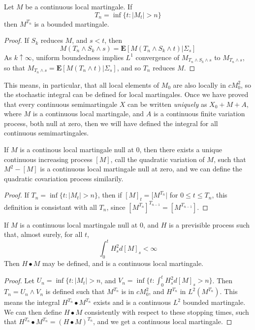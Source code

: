 \begin{lemma}
    Let $M$ be a continuous local martingale. If
    \[ T_n = \inf \{ t : |M_t| > n \} \]
    then $M^{T_n}$ is a bounded martingale.
\end{lemma}
\begin{proof}
    If $S_k$ reduces $M$, and $s < t$, then
    \[ M(T_n \wedge S_k \wedge s) = \mathbf{E}[M(T_n \wedge S_k \wedge t) | \Sigma_s] \]
    As $k \uparrow \infty$, uniform boundedness implies $L^1$ convergence of $M_{T_n \wedge S_k \wedge s}$ to $M_{T_n \wedge s}$, so that $M_{T_n \wedge s} = \mathbf{E}[M(T_n \wedge t)|\Sigma_s]$, and so $T_n$ reduces $M$.
\end{proof}

This means, in particular, that all local elements of $M_0$ are also locally in $cM^2_0$, so the stochastic integral can be defined for local martingales. Once we have proved that every continuous semimartingale $X$ can be written {\it uniquely} as $X_0 + M + A$, where $M$ is a continuous local martingale, and $A$ is a continuous finite variation process, both null at zero, then we will have defined the integral for all continuous semimartingales.

\begin{theorem}
    If $M$ is a continous local martingale null at 0, then there exists a unique continuous increasing process $[M]$, call the quadratic variation of $M$, such that $M^2 - [M]$ is a continuous local martingale null at zero, and we can define the quadratic covariation process similarily.
\end{theorem}
\begin{proof}
    If $T_n = \inf \{ t : |M_t| > n \}$, then if $[M]_t = [M^{T_n}|$ for $0 \leq t \leq T_n$, this definition is consistant with all $T_n$, since $[M^{T_n}]^{T_{n-1}} = [M^{T_{n-1}}]$.
\end{proof}

\begin{theorem}
    If $M$ is a continuous local martingale null at 0, and $H$ is a previsible process such that, almost surely, for all $t$,
    \[ \int_0^t H_s^2 d[M]_s < \infty \]
    Then $H \bullet M$ may be defined, and is a continuous local martingale.
\end{theorem}
\begin{proof}
    Let $U_n = \inf \{ t : |M_t| > n$, and $V_n = \inf \{ t : \int_0^t H_s^2 d[M]_s > n \}$. Then $T_n = U_n \wedge V_n$ is defined such that $M^{T_n}$ is in $cM^2_0$, and $H^{T_n}$ in $L^2(M^{T_n})$. This means the integral $H^{T_n} \bullet M^{T_n}$ exists and is a continuous $L^2$ bounded martingale. We can then define $H \bullet M$ consistently with respect to these stopping times, such that $H^{T_n} \bullet M^{T_n} = (H \bullet M)^{T_n}$, and we get a continuous local martingale.
\end{proof}

